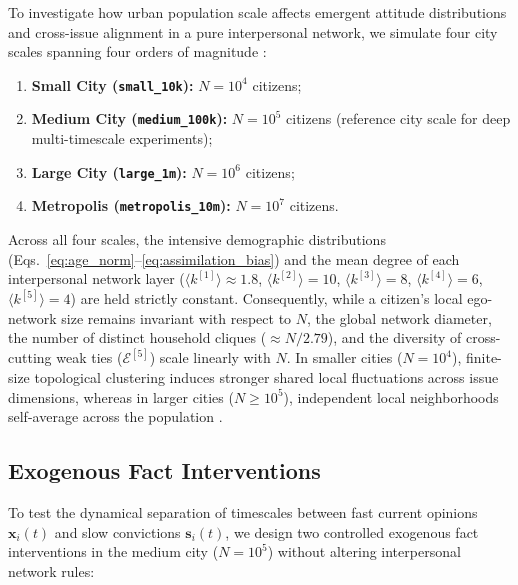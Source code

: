 To investigate how urban population scale affects emergent attitude distributions and cross-issue alignment in a pure interpersonal network, we simulate four city scales spanning four orders of magnitude \citep{bettencourt2007growth, schlapfer2014scaling}:
\begin{enumerate}
    \item \textbf{Small City (\texttt{small\_10k}):} $N = 10^4$ citizens;
    \item \textbf{Medium City (\texttt{medium\_100k}):} $N = 10^5$ citizens (reference city scale for deep multi-timescale experiments);
    \item \textbf{Large City (\texttt{large\_1m}):} $N = 10^6$ citizens;
    \item \textbf{Metropolis (\texttt{metropolis\_10m}):} $N = 10^7$ citizens.
\end{enumerate}
Across all four scales, the intensive demographic distributions (Eqs.~\eqref{eq:age_norm}--\eqref{eq:assimilation_bias}) and the mean degree of each interpersonal network layer ($\langle k^{[1]} \rangle \approx 1.8$, $\langle k^{[2]} \rangle = 10$, $\langle k^{[3]} \rangle = 8$, $\langle k^{[4]} \rangle = 6$, $\langle k^{[5]} \rangle = 4$) are held strictly constant. Consequently, while a citizen's local ego-network size remains invariant with respect to $N$, the global network diameter, the number of distinct household cliques ($\approx N / 2.79$), and the diversity of cross-cutting weak ties ($\mathcal{E}^{[5]}$) scale linearly with $N$. In smaller cities ($N = 10^4$), finite-size topological clustering induces stronger shared local fluctuations across issue dimensions, whereas in larger cities ($N \ge 10^5$), independent local neighborhoods self-average across the population \citep{castellano2009statistical}.

\subsection{Exogenous Fact Interventions}
\label{subsec:interventions}

To test the dynamical separation of timescales between fast current opinions $\mathbf{x}_i(t)$ and slow convictions $\mathbf{s}_i(t)$, we design two controlled exogenous fact interventions in the medium city ($N = 10^5$) without altering interpersonal network rules:

